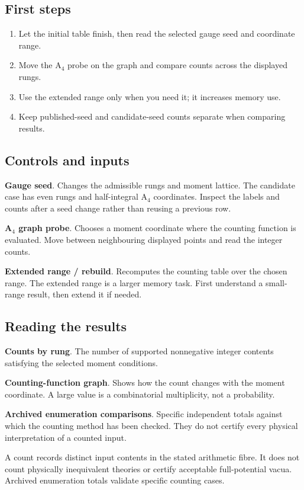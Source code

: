 \documentclass[11pt,a4paper]{article}
\begin{document}
\subsection*{First steps}
\begin{enumerate}
\item Let the initial table finish, then read the selected gauge seed and coordinate range.
\item Move the A\ensuremath{{}_{4}} probe on the graph and compare counts across the displayed rungs.
\item Use the extended range only when you need it; it increases memory use.
\item Keep published-seed and candidate-seed counts separate when comparing results.
\end{enumerate}
\subsection*{Controls and inputs}
\textbf{Gauge seed}. Changes the admissible rungs and moment lattice. The candidate case has even rungs and half-integral A\ensuremath{{}_{4}} coordinates. Inspect the labels and counts after a seed change rather than reusing a previous row.

\textbf{A\ensuremath{{}_{4}} graph probe}. Chooses a moment coordinate where the counting function is evaluated. Move between neighbouring displayed points and read the integer counts.

\textbf{Extended range / rebuild}. Recomputes the counting table over the chosen range. The extended range is a larger memory task. First understand a small-range result, then extend it if needed.

\subsection*{Reading the results}
\textbf{Counts by rung}. The number of supported nonnegative integer contents satisfying the selected moment conditions.

\textbf{Counting-function graph}. Shows how the count changes with the moment coordinate. A large value is a combinatorial multiplicity, not a probability.

\textbf{Archived enumeration comparisons}. Specific independent totals against which the counting method has been checked. They do not certify every physical interpretation of a counted input.

A count records distinct input contents in the stated arithmetic fibre. It does not count physically inequivalent theories or certify acceptable full-potential vacua. Archived enumeration totals validate specific counting cases.
\end{document}
